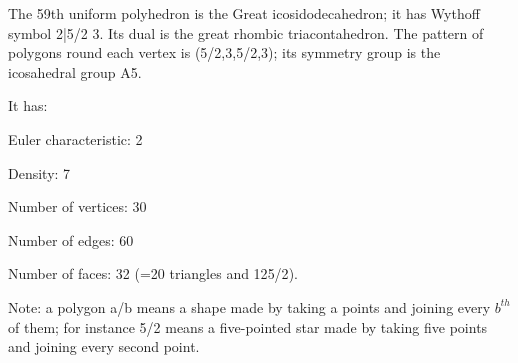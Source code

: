 The 59th uniform polyhedron is the Great icosidodecahedron; it has Wythoff symbol 2|5/2 3. Its dual is the great rhombic triacontahedron. The pattern of polygons round each vertex is (5/2,3,5/2,3); its symmetry group is the icosahedral group A5.\par
It has:\par
Euler characteristic: 2\par
Density: 7\par
Number of vertices: 30\par
Number of edges:  60\par
Number of faces: 32 (=20 triangles and 12{5/2}).\par
Note: a polygon a/b means a shape made by taking a points and joining every $b^{th}$  of them; for instance 5/2 means a five-pointed star made by taking five points and joining every second point.